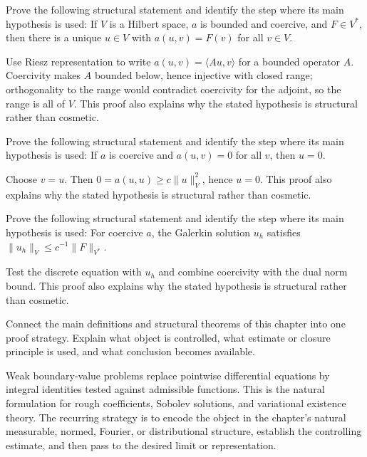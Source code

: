 \begin{problem}\label{prob:iii23-problem-09}
Prove the following structural statement and identify the step where its main hypothesis is used: If $V$ is a Hilbert space, $a$ is bounded and coercive, and $F\in V^*$, then there is a unique $u\in V$ with $a(u,v)=F(v)$ for all $v\in V$.
\end{problem}
\begin{solution}
Use Riesz representation to write $a(u,v)=\langle Au,v\rangle$ for a bounded operator $A$. Coercivity makes $A$ bounded below, hence injective with closed range; orthogonality to the range would contradict coercivity for the adjoint, so the range is all of $V$. This proof also explains why the stated hypothesis is structural rather than cosmetic.
\end{solution}

\begin{problem}\label{prob:iii23-problem-10}
Prove the following structural statement and identify the step where its main hypothesis is used: If $a$ is coercive and $a(u,v)=0$ for all $v$, then $u=0$.
\end{problem}
\begin{solution}
Choose $v=u$. Then $0=a(u,u)\ge c\|u\|_V^2$, hence $u=0$. This proof also explains why the stated hypothesis is structural rather than cosmetic.
\end{solution}

\begin{problem}\label{prob:iii23-problem-11}
Prove the following structural statement and identify the step where its main hypothesis is used: For coercive $a$, the Galerkin solution $u_h$ satisfies $\|u_h\|_V\le c^{-1}\|F\|_{V^*}$.
\end{problem}
\begin{solution}
Test the discrete equation with $u_h$ and combine coercivity with the dual norm bound. This proof also explains why the stated hypothesis is structural rather than cosmetic.
\end{solution}

\begin{problem}\label{prob:iii23-problem-12}
Connect the main definitions and structural theorems of this chapter into one proof strategy. Explain what object is controlled, what estimate or closure principle is used, and what conclusion becomes available.
\end{problem}
\begin{solution}
Weak boundary-value problems replace pointwise differential equations by integral identities tested against admissible functions. This is the natural formulation for rough coefficients, Sobolev solutions, and variational existence theory. The recurring strategy is to encode the object in the chapter's natural measurable, normed, Fourier, or distributional structure, establish the controlling estimate, and then pass to the desired limit or representation.
\end{solution}
